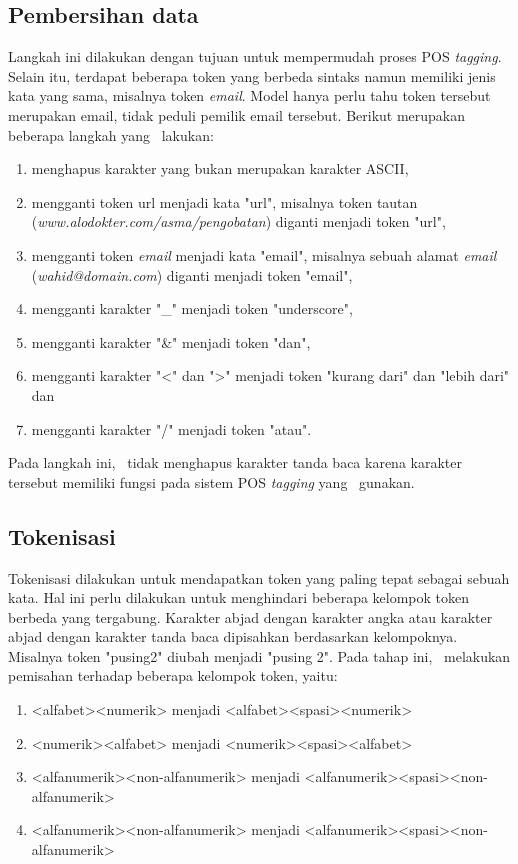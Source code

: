 \subsection{Pembersihan data}
Langkah ini dilakukan dengan tujuan untuk mempermudah proses POS \textit{tagging}. Selain itu, terdapat beberapa token yang berbeda sintaks namun memiliki jenis kata yang sama, misalnya token \textit{email}. Model hanya perlu tahu token tersebut merupakan email, tidak peduli pemilik email tersebut. Berikut merupakan beberapa langkah yang \saya~lakukan:
	
\begin{enumerate}
	\item menghapus karakter yang bukan merupakan karakter ASCII,
	\item mengganti token url menjadi kata "url", misalnya token tautan (\textit{www.alodokter.com/asma/pengobatan}) diganti menjadi token "url",
	\item mengganti token \textit{email} menjadi kata "email", misalnya sebuah alamat \textit{email} (\textit{wahid@domain.com}) diganti menjadi token "email",
	\item mengganti karakter "\_" menjadi token "underscore",
	\item mengganti karakter "\&" menjadi token "dan",
	\item mengganti karakter "\textless" dan "\textgreater" menjadi token "kurang dari" dan "lebih dari" dan
	\item mengganti karakter "/" menjadi token "atau".
\end{enumerate}
Pada langkah ini, \saya~tidak menghapus karakter tanda baca karena karakter tersebut memiliki fungsi pada sistem POS \textit{tagging} yang \saya~gunakan.
	
\subsection{Tokenisasi}
Tokenisasi dilakukan untuk mendapatkan token yang paling tepat sebagai sebuah kata. Hal ini perlu dilakukan untuk menghindari beberapa kelompok token berbeda yang tergabung. Karakter abjad dengan karakter angka atau karakter abjad dengan karakter tanda baca dipisahkan berdasarkan kelompoknya. Misalnya token "pusing2" diubah menjadi "pusing 2". Pada tahap ini, \saya~melakukan pemisahan terhadap beberapa kelompok token, yaitu:
\begin{enumerate}
	\item <alfabet><numerik> menjadi <alfabet><spasi><numerik>
	\item <numerik><alfabet> menjadi <numerik><spasi><alfabet>
	\item <alfanumerik><non-alfanumerik> menjadi <alfanumerik><spasi><non-alfanumerik>
	\item <alfanumerik><non-alfanumerik> menjadi <alfanumerik><spasi><non-alfanumerik>
\end{enumerate}
	
